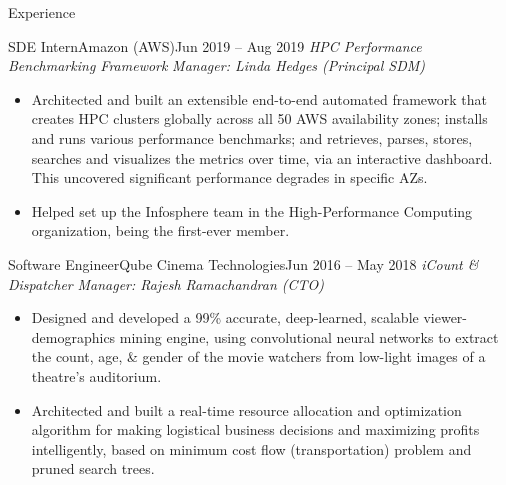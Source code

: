 \documentclass[]{mcdowellcv}
\begin{document}
	\begin{cvsection}{Experience}
	        \begin{cvsubsection}{SDE Intern}{Amazon (AWS)}{Jun 2019 – Aug 2019}
			\textit{HPC Performance Benchmarking Framework} \hfill \textit{Manager: Linda Hedges (Principal SDM)}
			\begin{itemize}
            \item Architected and built an extensible end-to-end automated framework that creates HPC clusters globally across all 50 AWS availability zones; installs and runs various performance benchmarks; and retrieves, parses, stores, searches and visualizes the metrics over time, via an interactive dashboard. This uncovered significant performance degrades in specific AZs. %
            \item Helped set up the Infosphere team in the High-Performance Computing organization, being the first-ever member.
			\end{itemize}
		\end{cvsubsection}

		\begin{cvsubsection}{Software Engineer}{Qube Cinema Technologies}{Jun 2016 – May 2018}
			\textit{iCount \& Dispatcher} \hfill \textit{Manager: Rajesh Ramachandran (CTO)}
			\begin{itemize}
            \item Designed and developed a 99\% accurate, deep-learned, scalable viewer-demographics mining engine, using convolutional neural networks to extract the count, age, \& gender of the movie watchers from low-light images of a theatre's auditorium. %
            \item Architected and built a real-time resource allocation and optimization algorithm for making logistical business decisions and maximizing profits intelligently, based on minimum cost flow (transportation) problem and pruned search trees.
			\end{itemize}
		\end{cvsubsection}



\end{cvsection}
\end{document}
